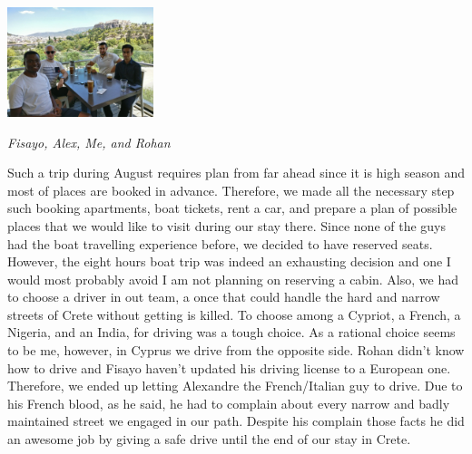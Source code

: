 \documentclass[10pt,a4paper]{article} %
\begin{document}
\begin{multicols}{3}
\begin{center}
	\includegraphics[width=0.32\textwidth]{media/chania_1.jpg}
	\par\textit{Fisayo, Alex, Me, and Rohan}
\end{center}


Such a trip during August requires plan from far ahead since it is high season 
and most of places are booked in advance. 
Therefore, we made all the necessary step such booking apartments, boat tickets, 
rent a car, and prepare a plan of possible places that we would like to visit 
during our stay there. 
Since none of the guys had the boat travelling experience before, we decided 
to have reserved seats. 
However, the eight hours boat trip was indeed an exhausting decision and one 
I would most probably avoid I am not planning on reserving a cabin.  
Also, we had to choose a driver in out team, a once that could handle the 
hard and narrow streets of Crete without getting is killed. 
To choose among a Cypriot, a French, a Nigeria, and an India, for driving 
was a tough choice. 
As a rational choice seems to be me, however, in Cyprus we drive from the 
opposite side. 
Rohan didn't know how to drive and Fisayo haven't updated his driving license 
to a European one. 
Therefore, we ended up letting Alexandre the French/Italian guy to drive. 
Due to his French blood, as he said, he had to complain about every narrow and 
badly maintained street we engaged in our path. 
Despite his complain those facts he did an awesome job by giving a safe drive 
until the end of our stay in Crete. 



\end{multicols}
\end{document}
